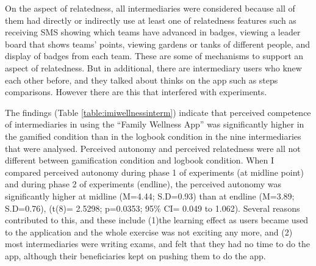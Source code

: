On the aspect of relatedness, all intermediaries were considered because all of them had directly or indirectly use at least one of relatedness features such as receiving SMS showing which teams have advanced in badges, viewing a leader board that shows teams' points, viewing gardens or tanks of different people, and display of badges from each team. These are some of mechanisms to support an aspect of relatedness\citep{sailer2013:psychological}. But in additional, there are intermediary users who knew each other before, and they talked about thinks on the app such as steps comparisons. However there are this that interfered with experiments.     
  
The findings (Table \ref{table:imiwellnessinterm}) indicate that perceived competence of intermediaries in using the ``Family Wellness App'' was significantly higher in the gamified condition than in the logbook condition in the nine intermediaries that were analysed. Perceived autonomy and perceived relatedness were all not different between gamification condition and logbook condition. When I compared perceived autonomy during phase 1 of experiments (at midline point) and during phase 2 of experiments (endline), the perceived autonomy was significantly higher at midline (M=4.44; S.D=0.93) than at endline (M=3.89; S.D=0.76), (t(8)= 2.5298; p=0.0353; 95\% CI= 0.049 to 1.062). Several reasons contributed to this, and these include (1)the learning effect as users became used to the application and the whole exercise was not exciting any more, and (2) most intermediaries were writing exams, and felt that they had no time to do the app, although their beneficiaries kept on pushing them to do the app.

